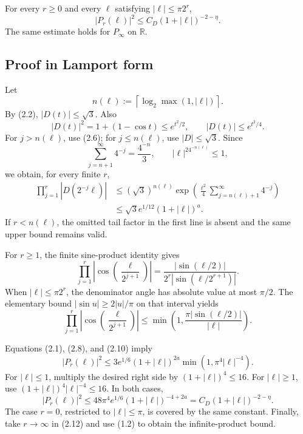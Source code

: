 \documentclass[11pt,a4paper]{article}
\begin{document}
\begin{lemma}\label{lem:envelope}
For every \(r\ge0\) and every \(\ell\) satisfying
\(|\ell|\le\pi2^r\),
\[
 |P_r(\ell)|^2\le C_D(1+|\ell|)^{-2-\eta}.                     \tag{2.4}
\]
The same estimate holds for \(P_\infty\) on \(\mathbb R\).
\end{lemma}

\subsection*{Proof in Lamport form}


Let
\[
 n(\ell):=\left\lceil\log_2\max(1,|\ell|)\right\rceil.          \tag{2.5}
\]
By (2.2), \(|D(t)|\le\sqrt3\).  Also
\[
 |D(t)|^2=1+(1-\cos t)\le e^{t^2/2},
\qquad |D(t)|\le e^{t^2/4}.                                   \tag{2.6}
\]
For \(j>n(\ell)\), use (2.6); for \(j\le n(\ell)\), use
\(|D|\le\sqrt3\).  Since
\[
 \sum_{j=n+1}^\infty4^{-j}=\frac{4^{-n}}3,\qquad
 |\ell|^24^{-n(\ell)}\le1,                                    \tag{2.7}
\]
we obtain, for every finite \(r\),
\begin{align}
 \prod_{j=1}^r|D(2^{-j}\ell)|
 &\le(\sqrt3)^{n(\ell)}
 \exp\left(\frac{\ell^2}{4}\sum_{j=n(\ell)+1}^\infty4^{-j}\right)\\
 &\le\sqrt3e^{1/12}(1+|\ell|)^a.                              \tag{2.8}
\end{align}
If \(r<n(\ell)\), the omitted tail factor in the first line is absent and the
same upper bound remains valid.


For \(r\ge1\), the finite sine-product identity gives
\[
 \prod_{j=1}^r\left|\cos\left(\frac{\ell}{2^{j+1}}\right)\right|
 =\frac{|\sin(\ell/2)|}{2^r|\sin(\ell/2^{r+1})|}.              \tag{2.9}
\]
When \(|\ell|\le\pi2^r\), the denominator angle has absolute value at most
\(\pi/2\).  The elementary bound
\(|\sin u|\ge2|u|/\pi\) on that interval yields
\[
 \prod_{j=1}^r\left|\cos\left(\frac{\ell}{2^{j+1}}\right)\right|
 \le\min\left(1,\frac{\pi|\sin(\ell/2)|}{|\ell|}\right).        \tag{2.10}
\]


Equations (2.1), (2.8), and (2.10) imply
\[
 |P_r(\ell)|^2
 \le3e^{1/6}(1+|\ell|)^{2a}
 \min(1,\pi^4|\ell|^{-4}).                                    \tag{2.11}
\]
For \(|\ell|\le1\), multiply the desired right side by
\((1+|\ell|)^4\le16\).  For \(|\ell|\ge1\), use
\((1+|\ell|)^4|\ell|^{-4}\le16\).  In both cases,
\[
 |P_r(\ell)|^2
 \le48\pi^4e^{1/6}(1+|\ell|)^{-4+2a}
 =C_D(1+|\ell|)^{-2-\eta}.                                   \tag{2.12}
\]
The case \(r=0\), restricted to \(|\ell|\le\pi\), is covered by the same
constant.  Finally, take \(r\to\infty\) in (2.12) and use (1.2) to obtain the
infinite-product bound. \QedStep
\end{document}
